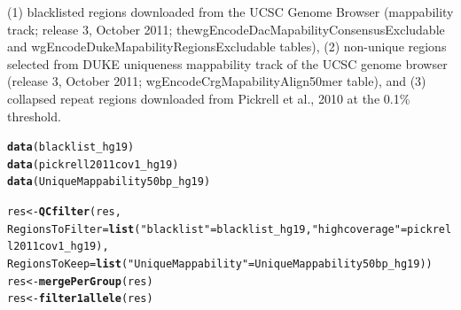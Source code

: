 \documentclass{article}\usepackage[]{graphicx}\usepackage[usenames,dvipsnames]{color}
\makeatletter
\newcommand{\hlstr}[1]{\textcolor[rgb]{0.192,0.494,0.8}{#1}}%
\newcommand{\hlstd}[1]{\textcolor[rgb]{0.345,0.345,0.345}{#1}}%
\newcommand{\hlkwb}[1]{\textcolor[rgb]{0.69,0.353,0.396}{#1}}%
\newcommand{\hlkwc}[1]{\textcolor[rgb]{0.333,0.667,0.333}{#1}}%
\newcommand{\hlkwd}[1]{\textcolor[rgb]{0.737,0.353,0.396}{\textbf{#1}}}%
\newenvironment{kframe}{%
 \def\at@end@of@kframe{}%
 \ifinner\ifhmode%
  \def\at@end@of@kframe{\end{minipage}}%
  \begin{minipage}{\columnwidth}%
 \fi\fi%
 \def\FrameCommand##1{\hskip\@totalleftmargin \hskip-\fboxsep
 \colorbox{shadecolor}{##1}\hskip-\fboxsep
     \hskip-\linewidth \hskip-\@totalleftmargin \hskip\columnwidth}%
 \MakeFramed {\advance\hsize-\width
   \@totalleftmargin\z@ \linewidth\hsize
   \@setminipage}}%
 {\par\unskip\endMakeFramed%
 \at@end@of@kframe}
\newenvironment{knitrout}{}{} %
\makeatother
\begin{document}
(1) blacklisted regions downloaded from the UCSC Genome Browser (mappability track; release 3, October 2011; thewgEncodeDacMapabilityConsensusExcludable and wgEncodeDukeMapabilityRegionsExcludable tables), (2) non-unique regions selected from DUKE uniqueness mappability track of the UCSC genome browser (release 3, October 2011; wgEncodeCrgMapabilityAlign50mer table), and (3) collapsed repeat regions downloaded from Pickrell et al., 2010 at the 0.1\% threshold. 

\begin{knitrout}
\color{fgcolor}\begin{kframe}
\begin{alltt}
\hlkwd{data}\hlstd{(blacklist_hg19)}
\hlkwd{data}\hlstd{(pickrell2011cov1_hg19)}
\hlkwd{data}\hlstd{(UniqueMappability50bp_hg19)}

\hlstd{res} \hlkwb{<-} \hlkwd{QCfilter}\hlstd{(res,}
                \hlkwc{RegionsToFilter}\hlstd{=}\hlkwd{list}\hlstd{(}\hlstr{"blacklist"}\hlstd{=blacklist_hg19,} \hlstr{"highcoverage"}\hlstd{=pickrell2011cov1_hg19),}
                \hlkwc{RegionsToKeep}\hlstd{=}\hlkwd{list}\hlstd{(}\hlstr{"UniqueMappability"}\hlstd{=UniqueMappability50bp_hg19))}
\hlstd{res} \hlkwb{<-} \hlkwd{mergePerGroup}\hlstd{(res)}
\hlstd{res} \hlkwb{<-} \hlkwd{filter1allele}\hlstd{(res)}
\end{alltt}
\end{kframe}
\end{knitrout}


\end{document}
